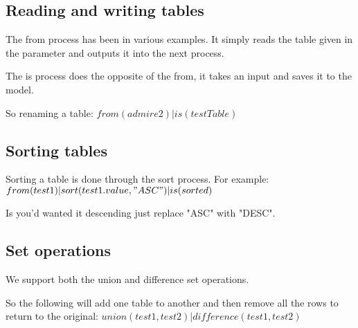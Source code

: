 \subsection{Reading and writing tables}
The from process has been in various examples. It simply reads the table given in the parameter and outputs it into the next process.

The is process does the opposite of the from, it takes an input and saves it to the model.

So renaming a table:
$from(admire2)|is(testTable)$

\subsection{Sorting tables}
Sorting a table is done through the sort process. 
For example: $from(test1)|sort(test1.value, "ASC")|is(sorted)$

Is you'd wanted it descending just replace "ASC" with "DESC".

\subsection{Set operations}
We support both the union and difference set operations.

So the following will add one table to another and then remove all the rows to return to the original: $union(test1, test2)|difference(test1, test2)$